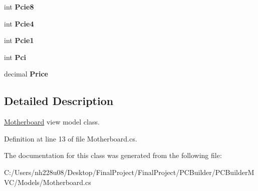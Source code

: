 \begin{DoxyCompactItemize}
\item 
int {\bfseries Pcie8}\hypertarget{class_p_c_builder_m_v_c_1_1_models_1_1_motherboard_a4a083ef2b68cd380c35ed521dce60774}{}\label{class_p_c_builder_m_v_c_1_1_models_1_1_motherboard_a4a083ef2b68cd380c35ed521dce60774}

\item 
int {\bfseries Pcie4}\hypertarget{class_p_c_builder_m_v_c_1_1_models_1_1_motherboard_a9eaebf0ccba2a9a479dd5d8c2987d43a}{}\label{class_p_c_builder_m_v_c_1_1_models_1_1_motherboard_a9eaebf0ccba2a9a479dd5d8c2987d43a}

\item 
int {\bfseries Pcie1}\hypertarget{class_p_c_builder_m_v_c_1_1_models_1_1_motherboard_a099818136af0a7b41a83857de04d4356}{}\label{class_p_c_builder_m_v_c_1_1_models_1_1_motherboard_a099818136af0a7b41a83857de04d4356}

\item 
int {\bfseries Pci}\hypertarget{class_p_c_builder_m_v_c_1_1_models_1_1_motherboard_a46ddeb94a1f5c767106ab10abef5977a}{}\label{class_p_c_builder_m_v_c_1_1_models_1_1_motherboard_a46ddeb94a1f5c767106ab10abef5977a}

\item 
decimal {\bfseries Price}\hypertarget{class_p_c_builder_m_v_c_1_1_models_1_1_motherboard_a0586a52b1a3f77980186217e9e8a8b4d}{}\label{class_p_c_builder_m_v_c_1_1_models_1_1_motherboard_a0586a52b1a3f77980186217e9e8a8b4d}

\end{DoxyCompactItemize}


\subsection{Detailed Description}
\hyperlink{class_p_c_builder_m_v_c_1_1_models_1_1_motherboard}{Motherboard} view model class. 



Definition at line 13 of file Motherboard.\+cs.



The documentation for this class was generated from the following file\+:\begin{DoxyCompactItemize}
\item 
C\+:/\+Users/nh228u08/\+Desktop/\+Final\+Project/\+Final\+Project/\+P\+C\+Builder/\+P\+C\+Builder\+M\+V\+C/\+Models/Motherboard.\+cs\end{DoxyCompactItemize}
